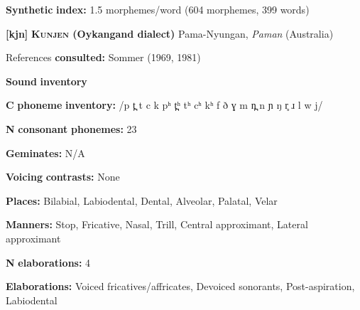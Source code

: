 \documentclass[output=paper]{langsci/langscibook}
\begin{document}
\begin{styleBody}
\textbf{Synthetic} \textbf{index:} 1.5 morphemes/word (604 morphemes, 399 words)
\end{styleBody}

\begin{styleBody}
\textbf{[kjn]}   \textbf{\textsc{Kunjen} \textbf{(Oykangand} \textbf{dialect)}}  Pama-Nyungan, \textit{Paman} (Australia)
\end{styleBody}

\begin{styleBody}
References \textbf{consulted:} Sommer (1969, 1981)
\end{styleBody}

\begin{styleBody}
\textbf{Sound} \textbf{inventory}
\end{styleBody}

\begin{styleBody}
\textbf{C} \textbf{phoneme} \textbf{inventory:} /p t̪ t c k pʰ t̪ʰ tʰ cʰ kʰ f ð ɣ m n̪ n ɲ ŋ r̥ ɹ l w j/
\end{styleBody}

\begin{styleBody}
\textbf{N} \textbf{consonant} \textbf{phonemes:} 23
\end{styleBody}

\begin{styleBody}
\textbf{Geminates:} N/A
\end{styleBody}

\begin{styleBody}
\textbf{Voicing} \textbf{contrasts:} None
\end{styleBody}

\begin{styleBody}
\textbf{Places:} Bilabial, Labiodental, Dental, Alveolar, Palatal, Velar
\end{styleBody}

\begin{styleBody}
\textbf{Manners:} Stop, Fricative, Nasal, Trill, Central approximant, Lateral approximant
\end{styleBody}

\begin{styleBody}
\textbf{N} \textbf{elaborations:} 4
\end{styleBody}

\begin{styleBody}
\textbf{Elaborations:} Voiced fricatives/affricates, Devoiced sonorants, Post-aspiration, Labiodental
\end{styleBody}
\end{document}
